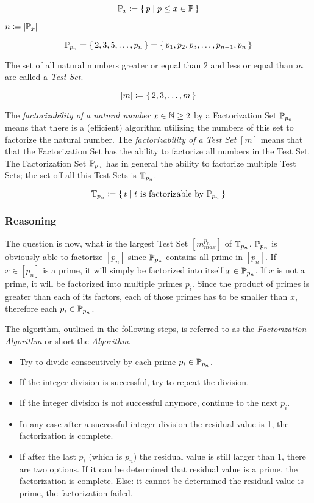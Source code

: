 \documentclass[a4paper,10pt]{article}
\begin{document}
$$\mathbb{P}_{x} \coloneq \lbrace \, { {p} \;|\; {p \leq x \in \mathbb{P}} } \, \rbrace$$

$n \coloneq |\mathbb{P}_x|$

$$\mathbb{P}_{p_n}
= \lbrace \, {2, 3, 5, \dots, p_n} \, \rbrace
= \lbrace \, {p_1, p_2, p_3, \dots, p_{n-1}, p_n} \, \rbrace$$

The set of all natural numbers greater or equal than $2$ and less or equal than $m$ are called a \emph{Test Set}.

$$[m] \coloneq \lbrace \, {2, 3, \dots, m} \, \rbrace$$

The \emph{factorizability of a natural number} $x \in \mathbb{N} \ge 2$ by a Factorization Set $\mathbb{P}_{p_n}$
means that there is a (efficient) algorithm utilizing the numbers of this set to factorize the natural number.
The \emph{factorizability of a Test Set} $[m]$ means that that the Factorization Set has the ability to
factorize all numbers in the Test Set.
The Factorization Set $\mathbb{P}_{p_n}$ has in general the ability to factorize multiple Test Sets;
the set off all this Test Sets is $\mathbb{T}_{p_n}$.

$$\mathbb{T}_{p_n} \coloneq \lbrace \, { {t} \;|\; {t\text{ is factorizable by }\mathbb{P}_{p_n}} } \, \rbrace$$

\subsubsection*{Reasoning}

The question is now, what is the largest Test Set $[m^{p_n}_{max}]$ of $\mathbb{T}_{p_n}$.
$\mathbb{P}_{p_n}$ is obviously able to factorize $[p_n]$ since $\mathbb{P}_{p_n}$ contains all prime in $[p_n]$.
If $x \in [p_n]$ is a prime, it will simply be factorized into itself $x \in \mathbb{P}_{p_n}$.
If $x$ is not a prime, it will be factorized into multiple primes $p_i$.
Since the product of primes is greater than each of its factors,
each of those primes has to be smaller than $x$, therefore each $p_i \in \mathbb{P}_{p_n}$.


The algorithm, outlined in the following steps, is referred to as the \emph{Factorization Algorithm}
or short the \emph{Algorithm}.

\begin{itemize}
 \item Try to divide consecutively by each prime $p_i \in \mathbb{P}_{p_n}$.
 \item If the integer division is successful, try to repeat the division.
 \item If the integer division is not successful anymore, continue to the next $p_i$.
 \item In any case after a successful integer division the residual value is 1, the factorization is complete.
 \item If after the last $p_i$ (which is $p_n$) the residual value is still larger than 1,
 there are two options.
 If it can be determined that residual value is a prime, the factorization is complete.
 Else: it cannot be determined the residual value is prime, the factorization failed.
\end{itemize}
\end{document}
